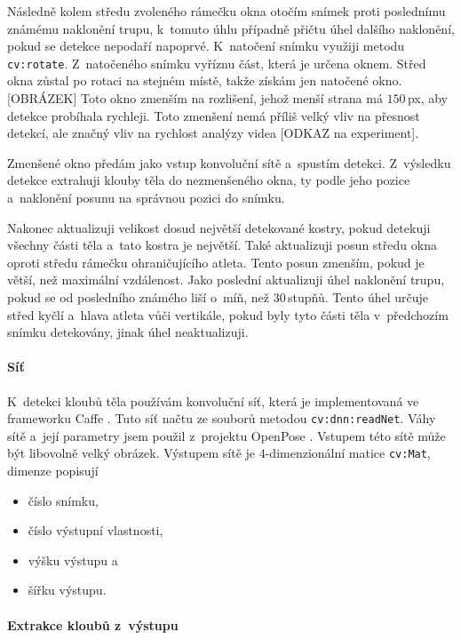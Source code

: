 Následně kolem středu zvoleného rámečku okna otočím snímek proti poslednímu známému naklonění trupu, k~tomuto úhlu případně přičtu úhel dalšího naklonění, pokud se detekce nepodaří napoprvé. K~natočení snímku využiji metodu \texttt{cv\::rotate}. Z~natočeného snímku vyříznu část, která je určena oknem. Střed okna zůstal po rotaci na stejném místě, takže získám jen natočené okno. [OBRÁZEK] Toto okno zmenším na rozlišení, jehož menší strana má $150$\,\rm px, aby detekce probíhala rychleji. Toto zmenšení nemá příliš velký vliv na přesnost detekcí, ale značný vliv na rychlost analýzy videa [ODKAZ na experiment].

Zmenšené okno předám jako vstup konvoluční sítě a~spustím detekci. Z~výsledku detekce extrahuji klouby těla do nezmenšeného okna, ty podle jeho pozice a~naklonění posunu na správnou pozici do snímku.

Nakonec aktualizuji velikost dosud největší detekované kostry, pokud detekuji všechny části těla a~tato kostra je největší. Také aktualizuji posun středu okna oproti středu rámečku ohraničujícího atleta. Tento posun zmenším, pokud je větší, než maximální vzdálenost. Jako poslední aktualizuji úhel naklonění trupu, pokud se od posledního známého liší o~míň, než $30$\,\rm stupňů. Tento úhel určuje střed kyčlí a~hlava atleta vůči vertikále, pokud byly tyto části těla v~předchozím snímku detekovány, jinak úhel neaktualizuji.

\paragraph{Síť}

K~detekci kloubů těla používám konvoluční síť, která je implementovaná ve frameworku Caffe \citep{Caffe}. Tuto síť načtu ze souborů metodou \texttt{cv\::dnn\::readNet}. Váhy sítě a~její parametry jsem použil z~projektu OpenPose \citep{OpenPose}. Vstupem této sítě může být libovolně velký obrázek. Výstupem sítě je $4$-dimenzionální matice \texttt{cv\::Mat}, dimenze popisují
\begin{itemize}
    \item číslo snímku,
    \item číslo výstupní vlastnosti,
    \item výšku výstupu a
    \item šířku výstupu.
\end{itemize}

\paragraph{Extrakce kloubů z~výstupu}


